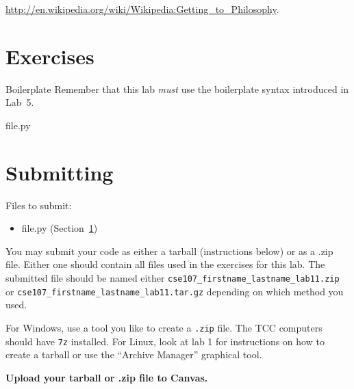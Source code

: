 \documentclass[11pt]{cselabheader}
\begin{document}
\centerline{\url{http://en.wikipedia.org/wiki/Wikipedia:Getting_to_Philosophy}.}

\pagebreak
\section{Exercises}
\label{sec:ex}


\begin{warningbox}{Boilerplate}
  Remember that this lab \emph{must} use the
  boilerplate syntax introduced in Lab~5.
\end{warningbox}

\begin{description}
  \item[file.py]
\end{description}

\pagebreak
\section{Submitting}

Files to submit:
\begin{itemize}
\item file.py (Section~\ref{sec:ex})
\end{itemize}

You may submit your code as either a tarball (instructions below) or as a .zip
file. Either one should contain all files used in the exercises for this lab.
The submitted file should be named either
\texttt{cse107\_firstname\_lastname\_lab11.zip} or
\texttt{cse107\_firstname\_lastname\_lab11.tar.gz} depending on which method you
used.

For Windows, use a tool you like to create a \texttt{.zip} file. The TCC
computers should have \texttt{7z} installed. For Linux, look at lab 1 for
instructions on how to create a tarball or use the ``Archive Manager'' graphical
tool.

\begin{center}
  \textbf{Upload your tarball or .zip file to Canvas.}
\end{center}
\end{document}
